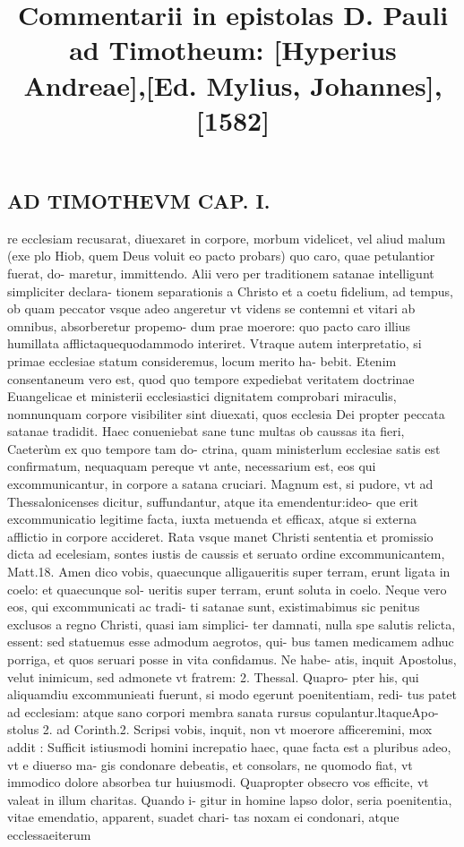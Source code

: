 \documentclass{article}
\begin{document}
\date{}
        \title{Commentarii in epistolas D. Pauli ad Timotheum: [Hyperius Andreae],[Ed. Mylius, Johannes], [1582]}
\maketitle
\tableofcontents
\clearpage
\begin{pages} 
\beginnumbering
        
\section*{AD TIMOTHEVM CAP. I. }
\marginpar{[ p.63 ]}\pstart re ecclesiam recusarat, diuexaret in corpore, morbum videlicet, vel aliud malum (exe plo Hiob, quem Deus voluit eo pacto probars) quo caro, quae petulantior fuerat, do- maretur, immittendo. Alii vero per traditionem satanae intelligunt simpliciter declara- tionem separationis a Christo et a coetu fidelium, ad tempus, ob quam peccator vsque  adeo angeretur vt videns se contemni et vitari ab omnibus, absorberetur propemo- dum prae moerore: quo pacto caro illius humillata afflictaquequodammodo interiret. Vtraque  autem interpretatio, si primae ecclesiae statum consideremus, locum merito ha- bebit. Etenim consentaneum vero est, quod quo tempore expediebat veritatem doctrinae Euangelicae et ministerii ecclesiastici dignitatem comprobari miraculis, nomnunquam corpore visibiliter sint diuexati, quos ecclesia Dei propter peccata satanae tradidit. Haec conueniebat sane tunc multas ob caussas ita fieri, Caeterùm ex quo tempore tam do- ctrina, quam ministerlum ecclesiae satis est confirmatum, nequaquam pereque vt ante, necessarium est, eos qui excommunicantur, in corpore a satana cruciari. Magnum est, si pudore, vt ad Thessalonicenses dicitur, suffundantur, atque ita emendentur:ideo- que erit excommunicatio legitime facta, iuxta metuenda et efficax, atque si externa afflictio in corpore accideret. Rata vsque  manet Christi sententia et promissio dicta ad ecelesiam, sontes iustis de caussis et seruato ordine excommunicantem, Matt.18. Amen dico vobis, quaecunque  alligaueritis super terram, erunt ligata in coelo: et quaecunque  sol- ueritis super terram, erunt soluta in coelo. Neque  vero eos, qui excommunicati ac tradi- ti satanae sunt, existimabimus sic penitus exclusos a regno Christi, quasi iam simplici- ter damnati, nulla spe salutis relicta, essent: sed statuemus esse admodum aegrotos, qui- bus tamen medicamem adhuc porriga, et quos seruari posse in vita confidamus. Ne habe- atis, inquit Apostolus, velut inimicum, sed admonete vt fratrem: 2. Thessal. Quapro- pter his, qui aliquamdiu excommunieati fuerunt, si modo egerunt poenitentiam, redi- tus patet ad ecclesiam: atque  sano corpori membra sanata rursus copulantur.ltaqueApo- stolus 2. ad Corinth.2. Scripsi vobis, inquit, non vt moerore afficeremini, mox addit : Sufficit istiusmodi homini increpatio haec, quae facta est a pluribus  adeo, vt e diuerso ma- gis condonare debeatis, et consolars, ne quomodo fiat, vt immodico dolore absorbea tur huiusmodi. Quapropter obsecro vos efficite, vt valeat in illum charitas. Quando i- gitur in homine lapso dolor, seria poenitentia, vitae emendatio, apparent, suadet chari- tas noxam ei condonari, atque  ecclessaeiterum 
\end{pages}
\end{document}
